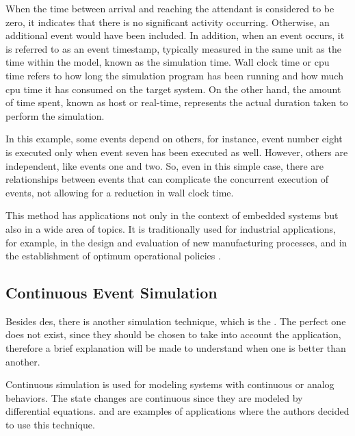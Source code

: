 When the time between arrival and reaching the attendant is considered to be zero, it indicates that there is no significant activity occurring. 
Otherwise, an additional event would have been included. In addition, when an event occurs, it is referred to as an event timestamp, typically 
measured in the same unit as the time within the model, known as the simulation time. Wall clock time or \gls{cpu} time refers to how long the 
simulation program has been running and how much \gls{cpu} time it has consumed on the target system. On the other hand, the amount of time 
spent, known as host or real-time, represents the actual duration taken to perform the simulation.

In this example, some events depend on others, for instance, event number eight is executed only when event seven has been executed as well. 
However, others are independent, like events one and two. So, even in this simple case, there are relationships between events that can complicate 
the concurrent execution of events, not allowing for a reduction in wall clock time.

This method has applications not only in the context of embedded systems but also in a wide area of topics. It is traditionally used for 
industrial applications, for example, in the design and evaluation of new
manufacturing processes, and in the establishment of optimum operational policies \cite{DES_SoA}. 

 
\subsection{Continuous Event Simulation}

Besides \gls{des}, there is another simulation technique, which is the . The perfect one does not exist, since they should be 
chosen to take into account the application, therefore a brief explanation will be made to understand when one is better than another.

Continuous simulation is used for modeling systems with continuous or analog behaviors. The state changes are continuous since they are modeled 
by differential equations. \cite{continousSim1} and \cite{continousSim2} are examples of applications where the authors decided to use this 
technique. 


